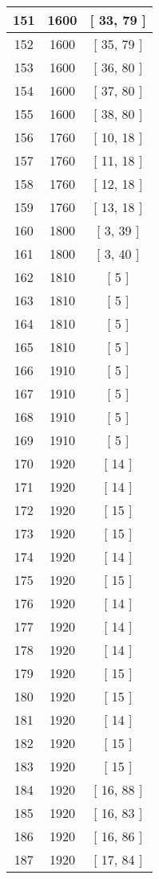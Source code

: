 \begin{center}
\begin{longtable}[H]{|| c c c ||}
151 & 1600 & [ 33, 79 ]
\\\hline
152 & 1600 & [ 35, 79 ]
\\\hline
153 & 1600 & [ 36, 80 ]
\\\hline
154 & 1600 & [ 37, 80 ]
\\\hline
155 & 1600 & [ 38, 80 ]
\\\hline
156 & 1760 & [ 10, 18 ]
\\\hline
157 & 1760 & [ 11, 18 ]
\\\hline
158 & 1760 & [ 12, 18 ]
\\\hline
159 & 1760 & [ 13, 18 ]
\\\hline
160 & 1800 & [ 3, 39 ]
\\\hline
161 & 1800 & [ 3, 40 ]
\\\hline
162 & 1810 & [ 5 ]
\\\hline
163 & 1810 & [ 5 ]
\\\hline
164 & 1810 & [ 5 ]
\\\hline
165 & 1810 & [ 5 ]
\\\hline
166 & 1910 & [ 5 ]
\\\hline
167 & 1910 & [ 5 ]
\\\hline
168 & 1910 & [ 5 ]
\\\hline
169 & 1910 & [ 5 ]
\\\hline
170 & 1920 & [ 14 ]
\\\hline
171 & 1920 & [ 14 ]
\\\hline
172 & 1920 & [ 15 ]
\\\hline
173 & 1920 & [ 15 ]
\\\hline
174 & 1920 & [ 14 ]
\\\hline
175 & 1920 & [ 15 ]
\\\hline
176 & 1920 & [ 14 ]
\\\hline
177 & 1920 & [ 14 ]
\\\hline
178 & 1920 & [ 14 ]
\\\hline
179 & 1920 & [ 15 ]
\\\hline
180 & 1920 & [ 15 ]
\\\hline
181 & 1920 & [ 14 ]
\\\hline
182 & 1920 & [ 15 ]
\\\hline
183 & 1920 & [ 15 ]
\\\hline
184 & 1920 & [ 16, 88 ]
\\\hline
185 & 1920 & [ 16, 83 ]
\\\hline
186 & 1920 & [ 16, 86 ]
\\\hline
187 & 1920 & [ 17, 84 ]
\\\hline

\end{longtable}
\end{center}
